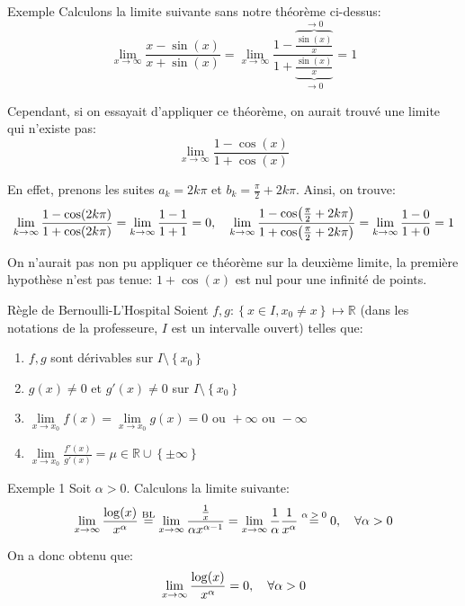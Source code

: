 \documentclass[a4paper]{article}
\begin{document}
\begin{parag}{Exemple}
    Calculons la limite suivante sans notre théorème ci-dessus:
    \[\lim_{x \to \infty} \frac{x - \sin\left(x\right)}{x + \sin\left(x\right)} = \lim_{x \to \infty} \frac{1 - \overbrace{\frac{\sin\left(x\right)}{x}}^{\to 0}}{1 + \underbrace{\frac{\sin\left(x\right)}{x}}_{\to 0}} = 1\]

    Cependant, si on essayait d'appliquer ce théorème, on aurait trouvé une limite qui n'existe pas: 
    \[\lim_{x \to \infty} \frac{1 - \cos\left(x\right)}{1 + \cos\left(x\right)}\]
    
    En effet, prenons les suites $a_k = 2k\pi$ et $b_k = \frac{\pi}{2} + 2k\pi$. Ainsi, on trouve: 
    \[\lim_{k \to \infty} \frac{1 - \cos\left(2k\pi\right)}{1 + \cos\left(2k\pi\right)} = \lim_{k \to \infty} \frac{1 - 1}{1 + 1} = 0, \mathspace  \lim_{k \to \infty} \frac{1 - \cos\left(\frac{\pi}{2} + 2k\pi\right)}{1 + \cos\left(\frac{\pi}{2} + 2k\pi\right)} = \lim_{k \to \infty} \frac{1 - 0}{1 + 0} = 1\]
    
    On n'aurait pas non pu appliquer ce théorème sur la deuxième limite, la première hypothèse n'est pas tenue: $1 + \cos\left(x\right)$ est nul pour une infinité de points.
\end{parag}

\begin{parag}{Règle de Bernoulli-L'Hospital}
    Soient $f, g : \left\{x \in I, x_0 \neq x\right\} \mapsto \mathbb{R}$ (dans les notations de la professeure, $I$ est un intervalle ouvert) telles que:
    \begin{enumerate}
        \item $f,g$ sont dérivables sur $I \setminus \left\{x_0\right\}$
        \item $g\left(x\right) \neq 0$ et $g'\left(x\right) \neq 0$ sur $I \setminus \left\{x_0\right\}$
        \item $\lim\limits_{x \to x_0} f\left(x\right) = \lim\limits_{x \to x_0} g\left(x\right) = 0 \text{ ou } +\infty \text{ ou } -\infty$
        \item $\lim\limits_{x \to x_0} \frac{f'\left(x\right)}{g'\left(x\right)} = \mu \in \mathbb{R} \cup \left\{\pm \infty\right\}$
    \end{enumerate}
\end{parag}

\begin{parag}{Exemple 1}
    Soit $\alpha > 0$. Calculons la limite suivante: 
    \[\lim_{x \to \infty} \frac{\log\left(x\right)}{x^{\alpha}} \over{=}{BL} \lim_{x \to \infty} \frac{\frac{1}{x}}{\alpha x^{\alpha - 1}} = \lim_{x \to \infty} \frac{1}{\alpha} \frac{1}{x^{\alpha}} \over{=}{$\alpha > 0$} 0, \mathspace \forall \alpha > 0\]
    
    On a donc obtenu que: 
    \[\lim_{x \to \infty} \frac{\log\left(x\right)}{x^{\alpha}} = 0, \mathspace \forall \alpha > 0\]
    
\end{parag}
\end{document}
